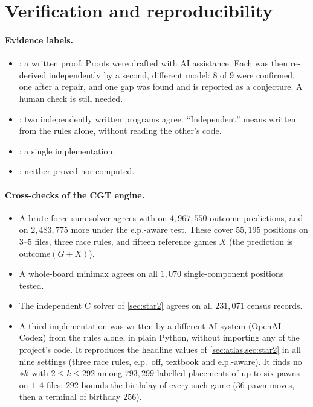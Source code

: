 \section{Verification and reproducibility}\label{sec:methods}

\paragraph{Evidence labels.}
\begin{itemize}
\item {}: a written proof. Proofs were drafted with AI assistance. Each was then re-derived
  independently by a second, different model: $8$ of $9$ were confirmed, one after a repair, and one gap was
  found and is reported as a conjecture. A human check is still needed.
\item {}: two independently written programs agree. ``Independent'' means written from the
  rules alone, without reading the other's code.
\item {}: a single implementation.
\item {}: neither proved nor computed.
\end{itemize}

\paragraph{Cross-checks of the CGT engine.}
\begin{itemize}
\item A brute-force sum solver agrees with  on $4{,}967{,}550$ outcome predictions, and on
  $2{,}483{,}775$ more under the e.p.-aware test. These cover $55{,}195$ positions on $3$--$5$ files, three
  race rules, and fifteen reference games $X$ (the prediction is $\mathrm{outcome}(G+X)$).
\item A whole-board minimax agrees on all $1{,}070$ single-component positions tested.
\item The independent C solver of \cref{sec:star2} agrees on all $231{,}071$ census records.
\item A third implementation was written by a different AI system (OpenAI Codex) from the rules alone, in
  plain Python, without importing any of the project's code. It reproduces the headline values of
  \cref{sec:atlas,sec:star2} in all nine settings (three race rules, e.p.\ off, textbook and e.p.-aware). It
  finds no $\mathord{\ast k}$ with $2\le k\le 292$ among $793{,}299$ labelled placements of up to six pawns on $1$--$4$
  files; $292$ bounds the birthday of every such game ($36$ pawn moves, then a terminal of birthday $256$).
\end{itemize}

